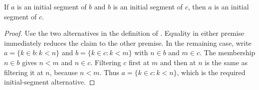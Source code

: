 \begin{helper}
If $a$ is an initial segment of $b$ and $b$ is an initial segment of $c$,
then $a$ is an initial segment of $c$.
\end{helper}
\begin{proof}
Use the two alternatives in the definition of
.  Equality in either premise immediately reduces
the claim to the other premise.  In the remaining case, write
$a=\{k\in b:k<n\}$ and $b=\{k\in c:k<m\}$ with $n\in b$ and $m\in c$.
The membership $n\in b$ gives $n<m$ and $n\in c$.  Filtering $c$ first at
$m$ and then at $n$ is the same as filtering it at $n$, because
$n<m$.  Thus $a=\{k\in c:k<n\}$, which is the required initial-segment
alternative.
\end{proof}
